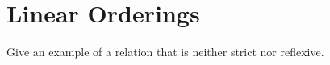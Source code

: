\chapter{Linear Orderings}

\begin{exercise}
	Give an example of a relation that is neither strict nor reflexive.
\end{exercise}
